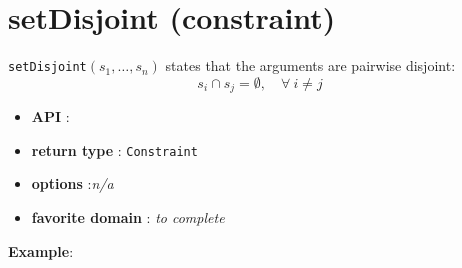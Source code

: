 \label{setdisjoint}
\hypertarget{setdisjoint}{}

\section{setDisjoint (constraint)}\label{setdisjoint:setdisjointconstraint}\hypertarget{setdisjoint:setdisjointconstraint}{}
\begin{notedef}
  \texttt{setDisjoint}$(s_1,\ldots,s_n)$ states that the arguments are pairwise disjoint:
$$s_i\cap s_j=\emptyset, \quad \forall\ i\neq j $$
\end{notedef}

\begin{itemize}
	\item \textbf{API} : 
	\item \textbf{return type} : \texttt{Constraint}
	\item \textbf{options} :\emph{n/a}
	\item \textbf{favorite domain} : \emph{to complete}
\end{itemize}

\textbf{Example}:

